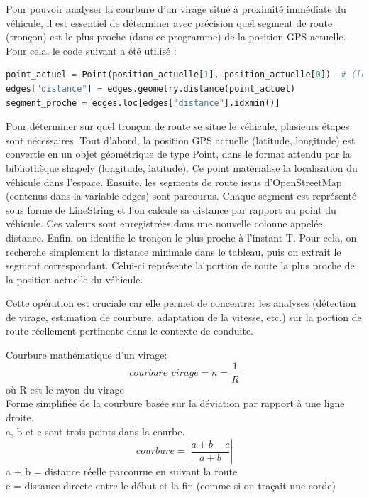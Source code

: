 Pour pouvoir analyser la courbure d’un virage situé à proximité immédiate du véhicule, il est essentiel de déterminer avec précision quel segment de route (tronçon) est le plus proche (dans ce programme) de la position GPS actuelle. Pour cela, le code suivant a été utilisé :
\begin{lstlisting}[language=Python, caption={Calcul de points}]
point_actuel = Point(position_actuelle[1], position_actuelle[0])  # (longitude, latitude)
edges["distance"] = edges.geometry.distance(point_actuel)
segment_proche = edges.loc[edges["distance"].idxmin()]
\end{lstlisting}
Pour déterminer sur quel tronçon de route se situe le véhicule, plusieurs étapes sont nécessaires.
Tout d’abord, la position GPS actuelle (latitude, longitude) est convertie en un objet géométrique de type Point, dans le format attendu par la bibliothèque shapely (longitude, latitude). Ce point matérialise la localisation du véhicule dans l’espace.
Ensuite, les segments de route issus d’OpenStreetMap (contenus dans la variable edges) sont parcourus. Chaque segment est représenté sous forme de LineString et l’on calcule sa distance par rapport au point du véhicule. Ces valeurs sont enregistrées dans une nouvelle colonne appelée distance.
Enfin, on identifie le tronçon le plus proche à l’instant T. Pour cela, on recherche simplement la distance minimale dans le tableau, puis on extrait le segment correspondant. Celui-ci représente la portion de route la plus proche de la position actuelle du véhicule.

Cette opération est cruciale car elle permet de concentrer les analyses (détection de virage, estimation de courbure, adaptation de la vitesse, etc.) sur la portion de route réellement pertinente dans le contexte de conduite.

\begin{tcolorbox}[title=Calcul de la courbure]
Courbure mathématique\cite{formule_curvature} d’un virage:
\[
courbure\_virage = \kappa = \frac{1}{R}
\]
où R est le rayon du virage\\
Forme simplifiée de la courbure basée sur la déviation par rapport à une ligne droite.\\
a, b et c sont trois points dans la courbe.\\
\[
courbure = \left| \frac{a + b - c}{a + b} \right|
\]
a + b = distance réelle parcourue en suivant la route \\
c = distance directe entre le début et la fin (comme si on traçait une corde)
\end{tcolorbox}


